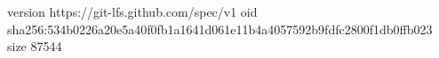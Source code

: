 version https://git-lfs.github.com/spec/v1
oid sha256:534b0226a20e5a40f0fb1a1641d061e11b4a4057592b9fdfc2800f1db0ffb023
size 87544
